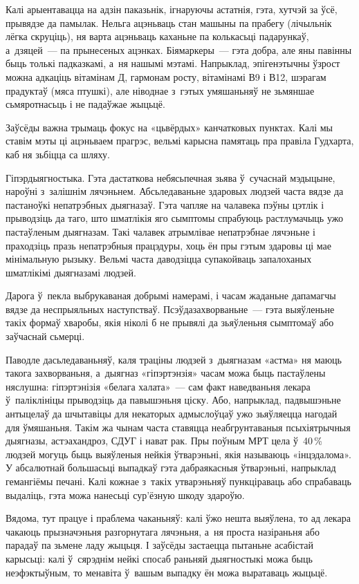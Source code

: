 Калі арыентавацца на адзін паказьнік, ігнаруючы астатнія, гэта, хутчэй за ўсё, прывядзе да памылак. Нельга ацэньваць стан машыны па прабегу (лічыльнік лёгка скруціць), ня варта ацэньваць каханьне па колькасьці падарункаў, а~дзяцей~--- па прынесеных ацэнках. Біямаркеры~--- гэта добра, але яны павінны быць толькі падказкамі, а~ня нашымі мэтамі. Напрыклад, эпігенэтычны ўзрост можна адкаціць вітамінам Д, гармонам росту, вітамінамі В9 і В12, шэрагам прадуктаў (мяса птушкі), але ніводнае з~гэтых умяшаньняў не зьмяншае сьмяротнасьць і не падаўжае жыцьцё.

Заўсёды важна трымаць фокус на «цьвёрдых» канчатковых пунктах. Калі мы ставім мэты ці ацэньваем прагрэс, вельмі карысна памятаць пра правіла Гудхарта, каб ня зьбіцца са шляху.

Гіпэрдыягностыка. Гэта дастаткова небясьпечная зьява ў~сучаснай мэдыцыне, нароўні з~залішнім лячэньнем. Абсьледаваньне здаровых людзей часта вядзе да пастаноўкі непатрэбных дыягназаў. Гэта чапляе на чалавека пэўны цэтлік і прыводзіць да таго, што шматлікія яго сымптомы спрабуюць растлумачыць ужо пастаўленым дыягназам. Такі чалавек атрымлівае непатрэбнае лячэньне і праходзіць празь непатрэбныя працэдуры, хоць ён пры гэтым здаровы ці мае мінімальную рызыку. Вельмі часта даводзіцца супакойваць запалоханых шматлікімі дыягназамі людзей.

Дарога ў~пекла выбрукаваная добрымі намерамі, і часам жаданьне дапамагчы вядзе да неспрыяльных наступстваў. Псэўдазахворваньне~--- гэта выяўленьне такіх формаў хваробы, якія ніколі б не прывялі да зьяўленьня сымптомаў або заўчаснай сьмерці.

Паводле дасьледаваньняў, каля траціны людзей з~дыягназам «астма» ня маюць такога захворваньня, а~дыягназ «гіпэртэнзія» часам можа быць пастаўлены няслушна: гіпэртэнізія «белага халата»~--- сам факт наведваньня лекара ў~паліклініцы прыводзіць да павышэньня ціску. Або, напрыклад, падвышэньне антыцелаў да шчытавіцы для некаторых адмыслоўцаў ужо зьяўляецца нагодай для ўмяшаньня. Такім жа чынам часта ставяцца неабгрунтаваныя псыхіятрычныя дыягназы, астэахандроз, СДУГ і нават рак. Пры поўным МРТ цела ў~40\,\% людзей могуць быць выяўленыя нейкія ўтварэньні, якія называюць «інцэдалома». У абсалютнай большасьці выпадкаў гэта дабраякасныя ўтварэньні, напрыклад гемангіёмы печані. Калі кожнае з~такіх утварэньняў пункціраваць або спрабаваць выдаліць, гэта можа нанесьці сур'ёзную шкоду здароўю.

Вядома, тут працуе і праблема чаканьняў: калі ўжо нешта выяўлена, то ад лекара чакаюць прызначэньня разгорнутага лячэньня, а~ня проста назіраньня або парадаў па зьмене ладу жыцьця. І заўсёды застаецца пытаньне асабістай карысьці: калі ў~сярэднім нейкі спосаб раньняй дыягностыкі можа быць неэфэктыўным, то менавіта ў~вашым выпадку ён можа выратаваць жыцьцё.

